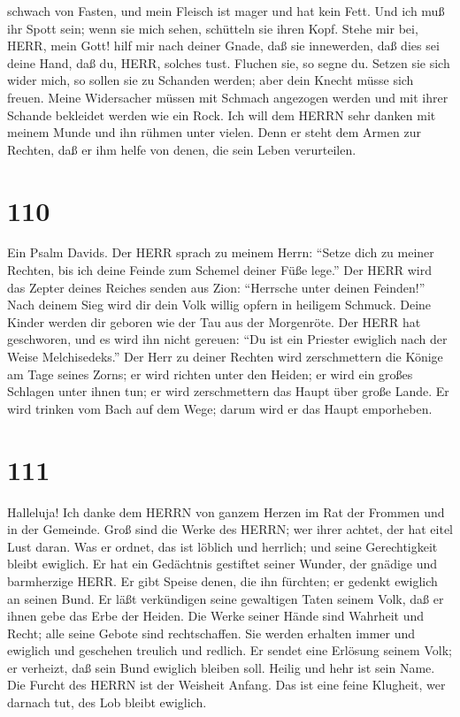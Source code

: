 schwach von Fasten, und mein Fleisch ist mager und hat kein Fett.
 Und ich muß ihr Spott sein; wenn sie mich sehen, schütteln
sie ihren Kopf.  Stehe mir bei, HERR, mein Gott! hilf mir
nach deiner Gnade,  daß sie innewerden, daß dies sei deine
Hand, daß du, HERR, solches tust.  Fluchen sie, so segne
du. Setzen sie sich wider mich, so sollen sie zu Schanden werden; aber
dein Knecht müsse sich freuen.  Meine Widersacher müssen
mit Schmach angezogen werden und mit ihrer Schande bekleidet werden wie
ein Rock.  Ich will dem HERRN sehr danken mit meinem Munde
und ihn rühmen unter vielen.  Denn er steht dem Armen zur
Rechten, daß er ihm helfe von denen, die sein Leben verurteilen.

\hypertarget{section-109}{%
\section{110}\label{section-109}}

 Ein Psalm Davids. Der HERR sprach zu meinem Herrn: ``Setze
dich zu meiner Rechten, bis ich deine Feinde zum Schemel deiner Füße
lege.''  Der HERR wird das Zepter deines Reiches senden aus
Zion: ``Herrsche unter deinen Feinden!''  Nach deinem Sieg
wird dir dein Volk willig opfern in heiligem Schmuck. Deine Kinder
werden dir geboren wie der Tau aus der Morgenröte.  Der HERR
hat geschworen, und es wird ihn nicht gereuen: ``Du ist ein Priester
ewiglich nach der Weise Melchisedeks.''  Der Herr zu deiner
Rechten wird zerschmettern die Könige am Tage seines Zorns; 
er wird richten unter den Heiden; er wird ein großes Schlagen unter
ihnen tun; er wird zerschmettern das Haupt über große Lande.
 Er wird trinken vom Bach auf dem Wege; darum wird er das
Haupt emporheben.

\hypertarget{section-110}{%
\section{111}\label{section-110}}

 Halleluja! Ich danke dem HERRN von ganzem Herzen im Rat der
Frommen und in der Gemeinde.  Groß sind die Werke des HERRN;
wer ihrer achtet, der hat eitel Lust daran.  Was er ordnet,
das ist löblich und herrlich; und seine Gerechtigkeit bleibt ewiglich.
 Er hat ein Gedächtnis gestiftet seiner Wunder, der gnädige
und barmherzige HERR.  Er gibt Speise denen, die ihn
fürchten; er gedenkt ewiglich an seinen Bund.  Er läßt
verkündigen seine gewaltigen Taten seinem Volk, daß er ihnen gebe das
Erbe der Heiden.  Die Werke seiner Hände sind Wahrheit und
Recht; alle seine Gebote sind rechtschaffen.  Sie werden
erhalten immer und ewiglich und geschehen treulich und redlich.
 Er sendet eine Erlösung seinem Volk; er verheizt, daß sein
Bund ewiglich bleiben soll. Heilig und hehr ist sein Name. 
Die Furcht des HERRN ist der Weisheit Anfang. Das ist eine feine
Klugheit, wer darnach tut, des Lob bleibt ewiglich.

